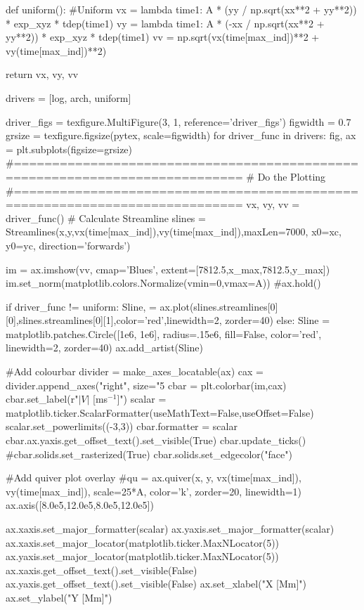 \begin{pycode}[chapter4]
def uniform():
    #Uniform
    vx = lambda time1: A * (yy / np.sqrt(xx**2 + yy**2)) * exp_xyz * tdep(time1)
    vy = lambda time1: A * (-xx / np.sqrt(xx**2 + yy**2)) * exp_xyz * tdep(time1)
    vv = np.sqrt(vx(time[max_ind])**2 + vy(time[max_ind])**2)
    
    return vx, vy, vv

drivers = [log, arch, uniform]

driver_figs = texfigure.MultiFigure(3, 1, reference='driver_figs')
figwidth = 0.7
grsize = texfigure.figsize(pytex, scale=figwidth)
for driver_func in drivers:
    fig, ax = plt.subplots(figsize=grsize)
    #============================================================================
    # Do the Plotting
    #============================================================================
    vx, vy, vv = driver_func()
    # Calculate Streamline
    slines = Streamlines(x,y,vx(time[max_ind]),vy(time[max_ind]),maxLen=7000,
                         x0=xc, y0=yc, direction='forwards')

    im = ax.imshow(vv, cmap='Blues', extent=[7812.5,x_max,7812.5,y_max])
    im.set_norm(matplotlib.colors.Normalize(vmin=0,vmax=A))
    #ax.hold()
    
    if driver_func != uniform:
        Sline, = ax.plot(slines.streamlines[0][0],slines.streamlines[0][1],color='red',linewidth=2, zorder=40)
    else:
	    Sline = matplotlib.patches.Circle([1e6, 1e6], radius=.15e6, fill=False, color='red', linewidth=2, zorder=40)
	    ax.add_artist(Sline)

    #Add colourbar
    divider = make_axes_locatable(ax)
    cax = divider.append_axes("right", size="5%
    cbar = plt.colorbar(im,cax)
    cbar.set_label(r"$|V|$ [ms$^{-1}$]")
    scalar = matplotlib.ticker.ScalarFormatter(useMathText=False,useOffset=False)
    scalar.set_powerlimits((-3,3))
    cbar.formatter = scalar
    cbar.ax.yaxis.get_offset_text().set_visible(True)
    cbar.update_ticks()
    #cbar.solids.set_rasterized(True)
    cbar.solids.set_edgecolor("face")

    #Add quiver plot overlay
    #qu = ax.quiver(x, y, vx(time[max_ind]), vy(time[max_ind]), scale=25*A, color='k', zorder=20, linewidth=1)
    ax.axis([8.0e5,12.0e5,8.0e5,12.0e5])

    ax.xaxis.set_major_formatter(scalar)
    ax.yaxis.set_major_formatter(scalar)
    ax.xaxis.set_major_locator(matplotlib.ticker.MaxNLocator(5))
    ax.yaxis.set_major_locator(matplotlib.ticker.MaxNLocator(5))
    ax.xaxis.get_offset_text().set_visible(False)
    ax.yaxis.get_offset_text().set_visible(False)
    ax.set_xlabel("X [Mm]")
    ax.set_ylabel("Y [Mm]")


\end{pycode}
